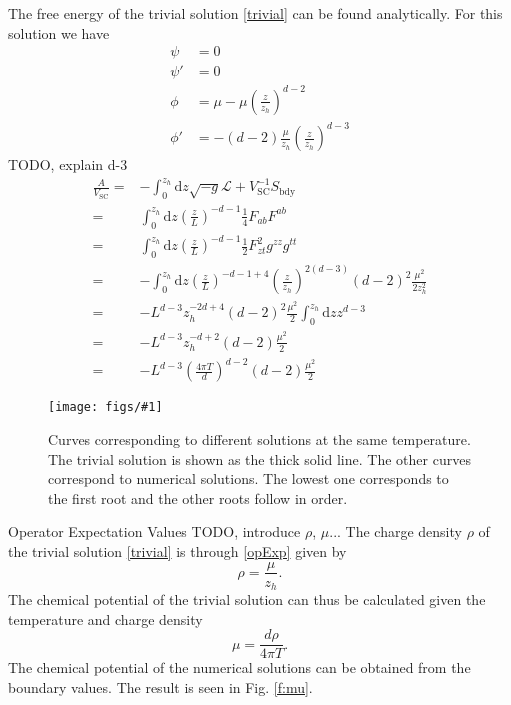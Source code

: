 \documentclass[12pt]{report}
\renewcommand{\d}{\ensuremath{\mathrm{d}}}
\renewcommand{\L}{\ensuremath{\mathcal{L}}}
\newcommand{\fig}[3]{
\begin{figure}
\centering
\texttt{[image: figs/\#1]}
\caption{#2}
\end{figure}
}
\begin{document}
The free energy of the trivial solution \eqref{trivial} can be found analytically. For this solution we have
\begin{equation}
 \begin{split}
  \psi&=0\\
  \psi'&=0\\
  \phi&=\mu-\mu\left(\frac{z}{z_h}\right)^{d-2}\\
  \phi'&=-(d-2)\frac{\mu}{z_h}\left(\frac{z}{z_h}\right)^{d-3}
 \end{split}
\end{equation}TODO, explain d-3
\begin{equation}
\begin{split}
 \frac{A}{V_\mathrm{SC}}=&-\int_0^{z_h}\d z \sqrt{-g}\L+V_\mathrm{SC}^{-1}S_{\mathrm{bdy}}\\
=&\int_0^{z_h}\d z \left(\frac{z}{L}\right)^{-d-1}\frac{1}{4}F_{ab}F^{ab}\\
=&\int_0^{z_h}\d z \left(\frac{z}{L}\right)^{-d-1}\frac{1}{2}F_{zt}^2g^{zz}g^{tt}\\
=&-\int_0^{z_h}\d z \left(\frac{z}{L}\right)^{-d-1+4}\left(\frac{z}{z_h}\right)^{2(d-3)}(d-2)^2\frac{\mu^2}{2z_h^2}\\
=&-L^{d-3}z_h^{-2d+4}(d-2)^2\frac{\mu^2}{2} \int_0^{z_h}\d z z^{d-3}\\
=&-L^{d-3}z_h^{-d+2}(d-2)\frac{\mu^2}{2}\\
=&-L^{d-3}\left(\frac{4\pi T}{d}\right)^{d-2}(d-2)\frac{\mu^2}{2}
\end{split}
\end{equation}
\fig{A}{Curves corresponding to different solutions at the same temperature. The trivial solution is shown as the thick solid line. The other curves correspond to numerical solutions. The lowest one corresponds to the first root and the other roots follow in order.\label{f:A}}

\section{Operator Expectation Values}
TODO, introduce $\rho$, $\mu$...
The charge density $\rho$ of the trivial solution \eqref{trivial} is through \eqref{opExp} given by
\begin{equation}
 \rho=\frac{\mu}{z_h}.
\end{equation}
The chemical potential of the trivial solution can thus be calculated given the temperature and charge density
\begin{equation}
 \mu=\frac{d\rho}{4\pi T}.
\end{equation}
The chemical potential of the numerical solutions can be obtained from the boundary values. The result is seen in Fig. \ref{f:mu}.
\end{document}

